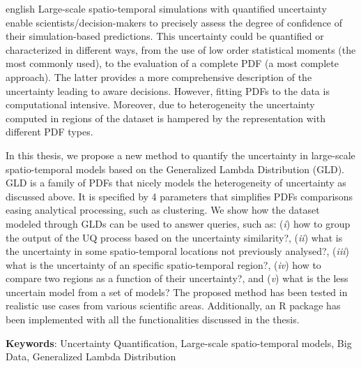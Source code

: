 \documentclass[
	12pt,				%
	openright,			%
	oneside,			%
	a4paper,			%
	sumario=tradicional,%
	brazil,			%
	french,				%
	spanish,			%
	english				%
	]{abntex2}
\theoremstyle{plain}
\theoremstyle{definition}
\begin{document}
\begin{resumo}[Abstract]
 \begin{otherlanguage*}{english}
Large-scale spatio-temporal simulations with quantified uncertainty enable scientists/decision-makers to precisely assess the degree of confidence of their simulation-based predictions. This uncertainty could be quantified or characterized in different ways, from the use of low order statistical moments (the most commonly used), to the evaluation of a complete PDF (a most complete approach). The latter provides a more comprehensive description of the uncertainty leading to aware decisions. However, fitting PDFs to the data is computational intensive. Moreover, due to heterogeneity the uncertainty computed in regions of the dataset is hampered by the representation with different PDF types. 
 
In this thesis, we propose a new method to quantify the uncertainty in large-scale spatio-temporal models based on the Generalized Lambda Distribution (GLD). GLD is a family of PDFs that nicely models the heterogeneity of uncertainty as discussed above. It is specified by 4 parameters that
simplifies PDFs comparisons easing analytical processing, such as clustering. We show how
the dataset modeled through GLDs can be used to answer queries, such as: (\textit{i}) how to
group the output of the UQ process based on the uncertainty similarity?, (\textit{ii}) what is the uncertainty in some spatio-temporal locations not previously analysed?, (\textit{iii}) what is the uncertainty of an specific spatio-temporal region?, (\textit{iv}) how to compare two regions as a function of their uncertainty?, and (\textit{v}) what is the less uncertain model from a set of models?
The proposed method has been tested in realistic use cases from various scientific areas.
Additionally, an R package has been implemented with all the functionalities discussed in
the thesis.
 
   \textbf{Keywords}: Uncertainty Quantification, Large-scale spatio-temporal models, Big Data, Generalized Lambda Distribution
 \end{otherlanguage*}
\end{resumo}

%
\end{document}
